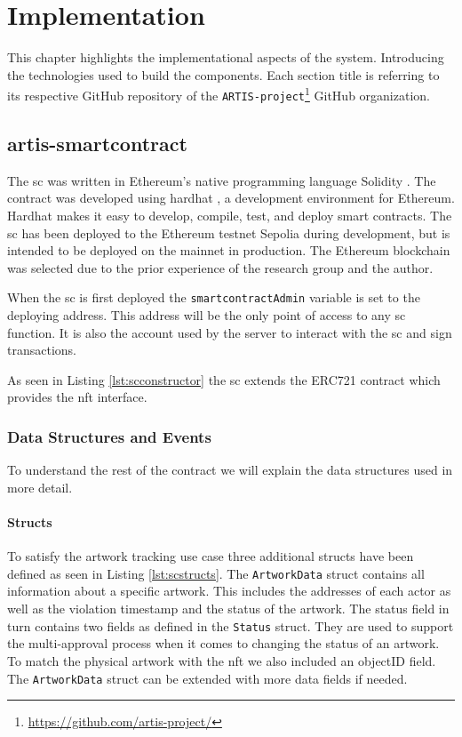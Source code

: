 \chapter{Implementation}
This chapter highlights the implementational aspects of the system. Introducing the technologies used to build the components. Each section title is referring to its respective GitHub repository of the \texttt{ARTIS-project}\footnote{\href{https://github.com/artis-project/}{https://github.com/artis-project/}} GitHub organization.

\section{artis-smartcontract}
The \gls{sc} was written in Ethereum's native programming language Solidity \cite{solidity}. The contract was developed using hardhat \cite{hardhat}, a development environment for Ethereum. Hardhat makes it easy to develop, compile, test, and deploy smart contracts. The \gls{sc} has been deployed to the Ethereum testnet Sepolia \cite{sepolia} during development, but is intended to be deployed on the mainnet in production. The Ethereum blockchain was selected due to the prior experience of the research group and the author.

When the \gls{sc} is first deployed the \texttt{smartcontractAdmin} variable is set to the deploying address. This address will be the only point of access to any \gls{sc} function. It is also the account used by the server to interact with the \gls{sc} and sign transactions.



As seen in Listing \ref{lst:scconstructor} the \gls{sc} extends the ERC721 \cite{erc721} contract which provides the \gls{nft} interface.

\subsection{Data Structures and Events}
To understand the rest of the contract we will explain the data structures used in more detail.

\subsubsection{Structs}
To satisfy the artwork tracking use case three additional structs have been defined as seen in Listing \ref{lst:scstructs}. The \texttt{ArtworkData} struct contains all information about a specific artwork. This includes the addresses of each actor as well as the violation timestamp and the status of the artwork. The status field in turn contains two fields as defined in the \texttt{Status} struct. They are used to support the multi-approval process when it comes to changing the status of an artwork. To match the physical artwork with the \gls{nft} we also included an objectID field. The \texttt{ArtworkData} struct can be extended with more data fields if needed.

